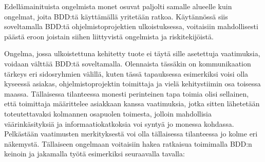 \documentclass[finnish,nonumbib,nocopyright]{gradu2}
\begin{document}
Edellämainituista ongelmista monet osuvat paljolti samalle alueelle kuin ongelmat, joita BDD:tä käyttämällä yritetään ratkoa. Käytännössä siis soveltamalla BDD:tä ohjelmistoprojektien ulkoistuksessa, voitaisiin mahdollisesti päästä eroon joistain siihen liittyvistä ongelmista ja riskitekijöistä.

Ongelma, jossa ulkoistettuna kehitetty tuote ei täytä sille asetettuja vaatimuksia, voidaan välttää BDD:tä soveltamalla. Olennaista tässäkin on kommunikaation tärkeys eri sidosryhmien välillä, kuten tässä tapauksessa esimerkiksi voisi olla kyseessä asiakas, ohjelmistoprojektin toimittaja ja vielä kehitystiimin osa toisessa maassa. Tällaisessa tilanteessa monesti perinteinen tapa toimia olisi sellainen, että toimittaja määrittelee asiakkaan kanssa vaatimuksia, jotka sitten lähetetään toteutettavaksi kolmannen osapuolen toimesta, jolloin mahdollisia väärinkäsityksiä ja informaatiokatkoksia voi syntyä jo monessa kohdassa. Pelkästään vaatimusten merkityksestä voi olla tällaisessa tilanteessa jo kolme eri näkemystä. Tällaiseen ongelmaan voitaisiin hakea ratkaisua toimimalla BDD:n keinoin ja jakamalla työtä esimerkiksi seuraavalla tavalla:
\end{document}
